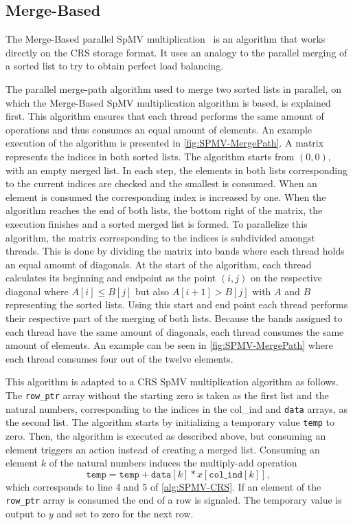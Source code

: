 \documentclass{siamart220329}
\begin{document}
\subsection{Merge-Based}
The Merge-Based parallel SpMV multiplication~\cite{SpMV-merge} is an algorithm that works directly on the CRS storage format. It uses an analogy to the parallel merging of a sorted list to try to obtain perfect load balancing.

The parallel merge-path algorithm used to merge two sorted lists in parallel, on which the Merge-Based SpMV multiplication algorithm is based, is explained first. This algorithm ensures that each thread performs the same amount of operations and thus consumes an equal amount of elements. An example execution of the algorithm is presented in \cref{fig:SPMV-MergePath}. A matrix represents the indices in both sorted lists. The algorithm starts from $(0, 0)$, with an empty merged list. In each step, the elements in both lists corresponding to the current indices are checked and the smallest is consumed. When an element is consumed the corresponding index is increased by one. When the algorithm reaches the end of both lists, the bottom right of the matrix, the execution finishes and a sorted merged list is formed. To parallelize this algorithm, the matrix corresponding to the indices is subdivided amongst threads. This is done by dividing the matrix into bands where each thread holds an equal amount of diagonals. At the start of the algorithm, each thread calculates its beginning and endpoint as the point $(i,j)$ on the respective diagonal where $A[i] \leq B[j]$ but also $A[i+1] > B[j]$ with $A$ and $B$ representing the sorted lists. Using this start and end point each thread performs their respective part of the merging of both lists. Because the bands assigned to each thread have the same amount of diagonals, each thread consumes the same amount of elements. An example can be seen in \cref{fig:SPMV-MergePath} where each thread consumes four out of the twelve elements.




This algorithm is adapted to a CRS SpMV multiplication algorithm as follows. The \texttt{row\_ptr} array without the starting zero is taken as the first list and the natural numbers, corresponding to the indices in the {col\_ind} and \texttt{data} arrays, as the second list. The algorithm starts by initializing a temporary value \texttt{temp} to zero. Then, the algorithm is executed as described above, but consuming an element triggers an action instead of creating a merged list. Consuming an element $k$ of the natural numbers induces the multiply-add operation
\begin{equation}
    \texttt{temp} = \texttt{temp} + \texttt{data}[k] * x[\texttt{col\_ind}[k]],
\end{equation}
which corresponds to line 4 and 5 of \cref{alg:SPMV-CRS}. If an element of the \texttt{row\_ptr} array is consumed the end of a row is signaled. The temporary value is output to $y$ and set to zero for the next row.
\end{document}
